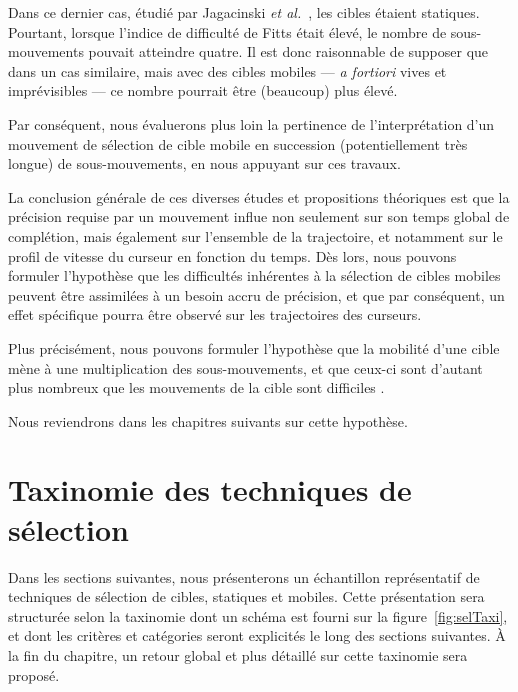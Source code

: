 	Dans ce dernier cas, étudié par Jagacinski \emph{et al.}~\cite{jagacinski1980fitts}, les cibles étaient statiques. Pourtant, lorsque l'indice de difficulté de Fitts était élevé, le nombre de sous-mouvements pouvait atteindre quatre. Il est donc raisonnable de supposer que dans un cas similaire, mais avec des cibles mobiles --- \emph{a fortiori} vives et imprévisibles --- ce nombre pourrait être (beaucoup) plus élevé.
	
	Par conséquent, nous évaluerons plus loin la pertinence de l'interprétation d'un mouvement de sélection de cible mobile en succession (potentiellement très longue) de sous-mouvements, en nous appuyant sur ces travaux.
	
	La conclusion générale de ces diverses études et propositions théoriques est que la précision requise par un mouvement influe non seulement sur son temps global de complétion, mais également sur l'ensemble de la trajectoire, et notamment sur le profil de vitesse du curseur en fonction du temps. Dès lors, nous pouvons formuler l'hypothèse que les difficultés inhérentes à la sélection de cibles mobiles peuvent être assimilées à un besoin accru de précision, et que par conséquent, un effet spécifique pourra être observé sur les trajectoires des curseurs.
	
	Plus précisément, nous pouvons formuler l'hypothèse que la mobilité d'une cible mène à une multiplication des sous-mouvements, et que ceux-ci sont d'autant plus nombreux que les mouvements de la cible sont \og difficiles \fg{}.
	
	Nous reviendrons dans les chapitres suivants sur cette hypothèse.
	
\section{Taxinomie des techniques de sélection}
	Dans les sections suivantes, nous présenterons un échantillon représentatif de techniques de sélection de cibles, statiques et mobiles. Cette présentation sera structurée selon la taxinomie dont un schéma est fourni sur la figure~\ref{fig:selTaxi}, et dont les critères et catégories seront explicités le long des sections suivantes. À la fin du chapitre, un retour global et plus détaillé sur cette taxinomie sera proposé.	
	
